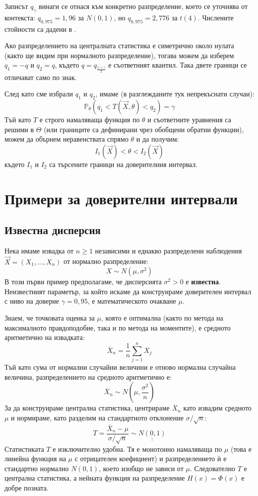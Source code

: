 \noindent
Записът $q_\gamma$ винаги се отнася към конкретно разпределение, което се уточнява от
контекста: $q_{0{,}975} = 1{,}96$ за $N(0,1)$, но $q_{0{,}975} = 2{,}776$ за $t(4)$.
Числените стойности са дадени в
.

Ако разпределението на централната статистика е симетрично около нулата (както ще видим при нормалното разпределение), тогава можем да изберем $q_1 = -q$ и $q_2 = q$, където $q = q_{\frac{1+\gamma}{2}}$ е съответният квантил. Така двете граници се отличават само по знак.

След като сме избрали $q_1$ и $q_2$, имаме (в разглежданите тук непрекъснати случаи):
\[
\mathbb{P}_{\theta}(q_1 < T(\vec{X}, \theta) < q_2) = \gamma
\]
Тъй като $T$ е строго намаляваща функция по $\theta$ и съответните уравнения са
решими в $\Theta$ (или границите са дефинирани чрез обобщени обратни функции),
можем да обърнем неравенствата спрямо $\theta$ и да получим:
\[
I_1(\vec{X}) < \theta < I_2(\vec{X})
\]
където $I_1$ и $I_2$ са търсените граници на доверителния интервал.

\section{Примери за доверителни интервали}

\subsection{Известна дисперсия}\label{sec:ci-known-var}
Нека имаме извадка от $n\ge 1$ независими и еднакво разпределени наблюдения $\vec{X} = (X_1, \dots, X_n)$ от нормално разпределение:
\[
X \sim N(\mu, \sigma^2)
\]
В този първи пример предполагаме, че дисперсията $\sigma^2>0$ е \textbf{известна}. Неизвестният параметър, за който искаме да конструираме доверителен интервал с ниво на доверие $\gamma = 0{,}95$, е математическото очакване $\mu$.

Знаем, че точковата оценка за $\mu$, която е оптимална (както по метода на максималното правдоподобие, така и по метода на моментите), е средното аритметично на извадката:
\[
\overline{X}_n = \frac{1}{n} \sum_{j=1}^n X_j
\]
Тъй като сума от нормални случайни величини е отново нормална случайна величина, разпределението на средното аритметично е:
\[
\overline{X}_n \sim N\left(\mu, \frac{\sigma^2}{n}\right)
\]
За да конструираме централна статистика, центрираме $\overline{X}_n$ като извадим средното $\mu$ и нормираме, като разделим на стандартното отклонение $\sigma / \sqrt{n}$:
\[
T = \frac{\overline{X}_n - \mu}{\sigma / \sqrt{n}} \sim \underline{\underline{N(0, 1)}}
\]
Статистиката $T$ е изключително удобна. Тя е монотонно намаляваща по $\mu$ (това е линейна функция на $\mu$ с отрицателен коефициент) и разпределението ѝ е стандартно нормално $N(0, 1)$, което изобщо не зависи от $\mu$. Следователно $T$ е централна статистика, а нейната функция на разпределение $H(x) = \Phi(x)$ е добре позната.

